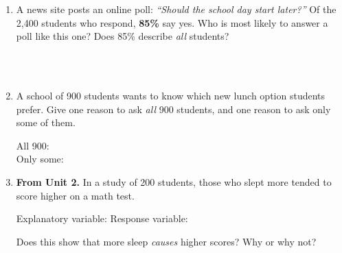 \documentclass[12pt]{article}
\begin{document}

\vspace{0.28in}

\begin{enumerate}[leftmargin=1.9em, itemsep=0.42in]

  \item A news site posts an online poll: \emph{``Should the school day start later?''} Of the
        2{,}400 students who respond, \textbf{85\%} say yes. Who is most likely to answer a poll
        like this one? Does 85\% describe \emph{all} students?

        \vspace{12pt}
        \\[18pt]\\[18pt]

  \item A school of 900 students wants to know which new lunch option students prefer. Give one
        reason to ask \emph{all} 900 students, and one reason to ask only some of them.

        \vspace{12pt}
        All 900: \\[18pt]
        Only some: 

  \item \textbf{From Unit 2.} In a study of 200 students, those who slept more tended to score
        higher on a math test.

        \vspace{12pt}
        Explanatory variable:  \qquad Response variable: 
        \vspace{16pt}

        Does this show that more sleep \emph{causes} higher scores? Why or why not?
        \vspace{12pt}

        \\[18pt]

\end{enumerate}
\end{document}
